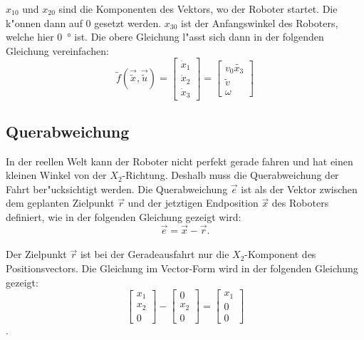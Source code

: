 \(x_{10}\) und \(x_{20}\) sind die Komponenten des Vektors, wo der Roboter startet. Die k"onnen dann auf 0 gesetzt werden. \(x_{30}\) ist der Anfangswinkel des Roboters, welche hier \si{0\degree} ist. Die obere Gleichung l"asst sich dann in der folgenden Gleichung vereinfachen:
\begin{equation}
    \widetilde{f}(\overrightarrow{\widetilde{x}}, \overrightarrow{\widetilde{u}}) =
    \begin{bmatrix*}
        \dot{x}_1 \\
        \dot{x}_2 \\
        \dot{x}_3
    \end{bmatrix*}
    = 
    \begin{bmatrix*}
        v_0\widetilde{x_3} \\
        \widetilde{v} \\
        \omega
    \end{bmatrix*}
\end{equation}

\subsection{Querabweichung}

In der reellen Welt kann der Roboter nicht perfekt gerade fahren und hat einen kleinen Winkel von der \(X_2\)-Richtung. Deshalb muss die Querabweichung der Fahrt ber"ucksichtigt werden. Die Querabweichung \(\overrightarrow{e}\) ist als der Vektor zwischen dem geplanten Zielpunkt \(\overrightarrow{r}\) und der jetztigen Endposition \(\overrightarrow{x}\) des Roboters definiert, wie in der folgenden Gleichung gezeigt wird:
\begin{equation*}
    \overrightarrow{e} = \overrightarrow{x} - \overrightarrow{r}.
\end{equation*} \\

Der Zielpunkt \(\overrightarrow{r}\) ist bei der Geradeausfahrt nur die \(X_2\)-Komponent des Positionsvectors.  Die Gleichung im Vector-Form wird in der folgenden Gleichung gezeigt:
\begin{equation*}
    \begin{bmatrix}
        x_1 \\
        x_2 \\
        0
    \end{bmatrix}
    -
    \begin{bmatrix}
        0 \\
        x_2 \\
        0
    \end{bmatrix}
    =
    \begin{bmatrix}
        x_1 \\
        0 \\
        0
    \end{bmatrix}
\end{equation*}.

